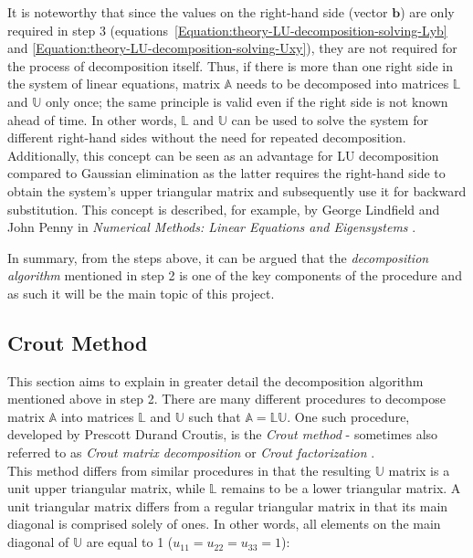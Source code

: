 It is noteworthy that since the values on the right-hand side (vector $ \textbf{b} $) are only required in step 3 (equations~\ref{Equation:theory-LU-decomposition-solving-Lyb} and \ref{Equation:theory-LU-decomposition-solving-Uxy}), they are not required for the process of decomposition itself. Thus, if there is more than one right side in the system of linear equations, matrix $ \mathbb{A} $ needs to be decomposed into matrices $ \mathbb{L} $ and $ \mathbb{U} $ only once; the same principle is valid even if the right side is not known ahead of time. In other words, $ \mathbb{L} $ and $ \mathbb{U} $ can be used to solve the system for different right-hand sides without the need for repeated decomposition. Additionally, this concept can be seen as an advantage for LU decomposition compared to Gaussian elimination as the latter requires the right-hand side to obtain the system's upper triangular matrix and subsequently use it for backward substitution. This concept is described, for example, by George Lindfield and John Penny in \emph{Numerical Methods: Linear Equations and Eigensystems} \cite{Lindfield2019}.

In summary, from the steps above, it can be argued that the \textit{decomposition algorithm} mentioned in step 2 is one of the key components of the procedure and as such it will be the main topic of this project.

\subsection{Crout Method}\label{Subsection:theory-LU-decomposition-crout-method}
This section aims to explain in greater detail the decomposition algorithm mentioned above in step 2. There are many different procedures to decompose matrix $ \mathbb{A} $ into matrices $ \mathbb{L} $ and $ \mathbb{U} $ such that $ \mathbb{A} = \mathbb{LU} $. One such procedure, developed by Prescott Durand Croutis, is the \textit{Crout method} - sometimes also referred to as \textit{Crout matrix decomposition} or \textit{Crout factorization} \cite{Press2007}. \\
This method differs from similar procedures in that the resulting $ \mathbb{U} $ matrix is a unit upper triangular matrix, while $ \mathbb{L} $ remains to be a lower triangular matrix. A unit triangular matrix differs from a regular triangular matrix in that its main diagonal is comprised solely of ones. In other words, all elements on the main diagonal of $ \mathbb{U} $ are equal to 1 ($ u_{11} = u_{22} = u_{33} = 1 $):

